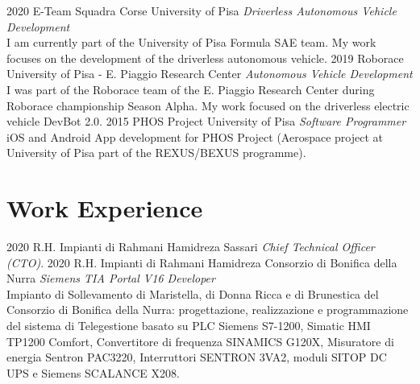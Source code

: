 \documentclass[]{friggeri-cv}
\begin{document}
\begin{entrylist}
\entry
{2020}
{E-Team Squadra Corse}
{University of Pisa}
{\emph{Driverless Autonomous Vehicle Development}\\
I am currently part of the University of Pisa Formula SAE team. My work focuses
on the development of the driverless autonomous vehicle.}
\entry
{2019}
{Roborace}
{University of Pisa - E. Piaggio Research Center}
{\emph{Autonomous Vehicle Development}\\
I was part of the Roborace team of the E. Piaggio Research Center during
Roborace championship Season Alpha. My work focused on the driverless electric
vehicle DevBot 2.0.}
\entry
{2015}
{PHOS Project}
{University of Pisa}
{\emph{Software Programmer}\\
iOS and Android App development for PHOS Project (Aerospace project at
University of Pisa part of the REXUS/BEXUS programme).}
\end{entrylist}

\patchcmd{\entry}{14.8cm}{11.8cm}{}{}
\section{Work Experience}
\vspace{-3mm}
\begin{entrylist}
\entry
{2020}
{R.H. Impianti di Rahmani Hamidreza}
{Sassari}
{\emph{Chief Technical Officer (CTO)}.}
\entry
{2020}
{R.H. Impianti di Rahmani Hamidreza}
{Consorzio di Bonifica della Nurra}
{\emph{Siemens TIA Portal V16 Developer}\\
Impianto di Sollevamento di Maristella, di Donna Ricca e di Brunestica del
Consorzio di Bonifica della Nurra: progettazione, realizzazione e programmazione
del sistema di Telegestione basato su PLC Siemens S7-1200, Simatic HMI TP1200
Comfort, Convertitore di frequenza SINAMICS G120X, Misuratore di energia Sentron
PAC3220, Interruttori SENTRON 3VA2, moduli SITOP DC UPS e Siemens SCALANCE X208.}
\end{entrylist}
\clearpage
\end{document}
